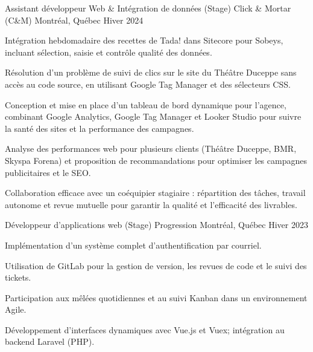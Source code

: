 

\begin{cventries}

  \cventry
    {Assistant développeur Web \& Intégration de données (Stage)} %
    {Click \& Mortar (C\&M)} %
    {Montréal, Québec} %
    {Hiver 2024} %
    {
      \begin{cvitems} %
      	\item {Intégration hebdomadaire des recettes de Tada! dans Sitecore pour Sobeys, incluant sélection, saisie et contrôle qualité des données.}
      	\item {Résolution d’un problème de suivi de clics sur le site du Théâtre Duceppe sans accès au code source, en utilisant Google Tag Manager et des sélecteurs CSS.}
      	\item {Conception et mise en place d’un tableau de bord dynamique pour l’agence, combinant Google Analytics, Google Tag Manager et Looker Studio pour suivre la santé des sites et la performance des campagnes.}
      	\item {Analyse des performances web pour plusieurs clients (Théâtre Duceppe, BMR, Skyspa Forena) et proposition de recommandations pour optimiser les campagnes publicitaires et le SEO.}
      	\item {Collaboration efficace avec un coéquipier stagiaire : répartition des tâches, travail autonome et revue mutuelle pour garantir la qualité et l’efficacité des livrables.}
      \end{cvitems}
    }

  \cventry
    {Développeur d’applications web (Stage)} %
    {Progression} %
    {Montréal, Québec} %
    {Hiver 2023} %
    {
      \begin{cvitems}
  		\item {Implémentation d’un système complet d’authentification par courriel.}
  		\item {Utilisation de GitLab pour la gestion de version, les revues de code et le suivi des tickets.}
  		\item {Participation aux mêlées quotidiennes et au suivi Kanban dans un environnement Agile.}
  		\item {Développement d’interfaces dynamiques avec Vue.js et Vuex; intégration au backend Laravel (PHP).}
   	  \end{cvitems}
    }
    

\end{cventries}

